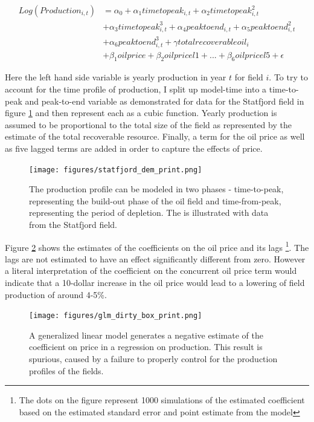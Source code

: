\documentclass[11pt]{article}
\begin{document}
	\begin{equation}
	\begin{split}	
	 Log(Production_{i,t})  &= \alpha_0 + \alpha_1 timetopeak_{i,t} + \alpha_2 timetopeak_{i,t}^2 \\
	  \quad & + \alpha_3 timetopeak_{i,t}^3  + \alpha_4 peaktoend_{i,t} + \alpha_5 peaktoend_{i,t}^2 \\
	  \quad & + \alpha_6 peaktoend_{i,t}^3 + \gamma totalrecoverableoil_i \\
	  \quad & + \beta_1 oilprice + \beta_2 oilpricel1 + ...+ \beta_6 oilpricel5 + \epsilon	
	\label{glm_eqn}
	\end{split}
	\end{equation}

Here the left hand side variable is yearly production in year $t$ for field $i$.  To try to account for the time profile of production, I split up model-time into a time-to-peak and peak-to-end variable as demonstrated for data for the Statfjord field in figure \ref{statfjord_dem} and then represent each as a cubic function.  Yearly production is assumed to be proportional to the total size of the field as represented by the estimate of the total recoverable resource.  Finally, a term for the oil price as well as five lagged terms are added in order to capture the effects of price.  

\begin{figure}
\texttt{[image: figures/statfjord\_dem\_print.png]}
\caption{The production profile can be modeled in two phases - time-to-peak, representing the build-out phase of the oil field and time-from-peak, representing the period of depletion. The is illustrated with data from the Statfjord field.}
\label{statfjord_dem}
\end{figure}

Figure \ref{glm_dirty_box} shows the estimates of the coefficients on the oil price and its lags \footnote{The dots on the figure represent 1000 simulations of the estimated coefficient based on the estimated standard error and point estimate from the model}.  The lags are not estimated to have an effect significantly different from zero. However a literal interpretation of the coefficient on the concurrent oil price term would indicate that a 10-dollar increase in the oil price would lead to a lowering of field production of around 4-5\%.

\begin{figure}
\texttt{[image: figures/glm\_dirty\_box\_print.png]}
\caption{A generalized linear model generates a negative estimate of the coefficient on price in a regression on production.  This result is spurious, caused by a failure to properly control for the production profiles of the fields.}
\label{glm_dirty_box}
\end{figure}
\end{document}
